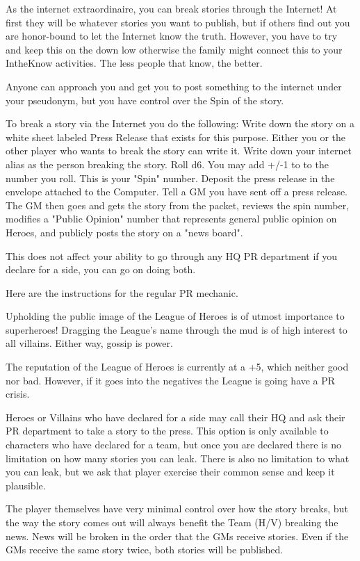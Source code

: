 \documentclass[green]{LRSguildcamp1}
\begin{document}
\name{\gInternetPR{}}

As \cTween{} the internet extraordinaire, you can break stories through the Internet! At first they will be whatever stories you want to publish, but if others find out you are honor-bound to let the Internet know the truth. However, you have to try and keep this on the down low otherwise the family might connect this to your IntheKnow activities. The less people that know, the better. 

Anyone can approach you and get you to post something to the internet under your pseudonym, but you have control over the Spin of the story. 

To break a story via the Internet you do the following:
Write down the story on a white sheet labeled Press Release that exists for this purpose. Either you or the other player who wants to break the story can write it. 
Write down your internet alias as the person breaking the story.  
Roll d6.  You may add +/-1 to to the number you roll. This is your "Spin" number.
Deposit the press release in the envelope attached to the Computer. 
Tell a GM you have sent off a press release.
The GM then goes and gets the story from the packet, reviews the spin number, modifies a "Public Opinion" number that represents general public opinion on Heroes, and publicly posts the story on a "news board". 

This does not affect your ability to go through any HQ PR department if you declare for a side, you can go on doing both. 


Here are the instructions for the regular PR mechanic. 

Upholding the public image of the League of Heroes is of utmost importance to superheroes! 
Dragging the League's name through the mud is of high interest to all villains. Either way, gossip is power. 

The reputation of the League of Heroes is currently at a +5, which neither good nor bad. However, if it goes into the negatives the League is going have a PR crisis. 

Heroes or Villains who have declared for a side may call their HQ and ask their PR department to take a story to the press. This option is only available to characters who have declared for a team, but once you are declared there is no limitation on how many stories you can leak. There is also no limitation to what you can leak, but we ask that player exercise their common sense and keep it plausible. 

The player themselves have very minimal control over how the story breaks, but the way the story comes out will always benefit the Team (H/V) breaking the news. News will be broken in the order that the GMs receive stories. Even if the GMs receive the same story twice, both stories will be published. 
\end{document}
